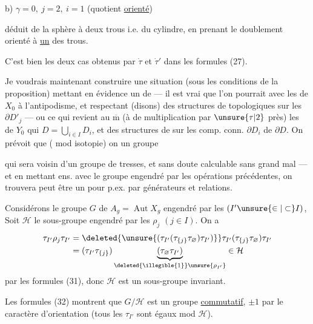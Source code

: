 b) $\gamma=0,\ j=2,\ i=1$ (quotient \uline{orienté})

déduit de la sphère à deux trous i.e. du cylindre, en prenant le doublement orienté  à \uline{un} des trous. 

C'est bien les deux cas obtenus  par $\dot\tau$ et $\dot\tau'$ dans les formules (27).

Je voudrais maintenant construire une situation (sous les conditions de la proposition) mettant en évidence un  de  --- il est vrai que l'on pourrait  avec  les  de $X_0$  à l'antipodisme\inserted{$\tau$},  et respectant (disons) des structures de  topologiques sur les $\partial D'_j$ --- ou ce qui revient  au $\overline{\mathrm m}$ (à  de multiplication par $\unsure{\tau|2}$ près) les  de $Y_0$ qui   $D=\bigcup_{i\in I}D_i$, et  des structures de  sur  les comp. conn. $\partial D_i$ de $\partial D$. On prévoit que ( mod isotopie) on  un groupe



qui sera voisin d'un groupe de tresses, et sans doute calculable sans grand mal --- et en  mettant ens. avec le groupe engendré par les opérations précédentes, on trouvera peut être un  pour  p.ex.  par générateurs  et relations.

Considérons le  groupe $G$ de $A_g=\operatorname{Aut}X_g$ engendré par les  $(I'\unsure{\in|\subset} I)$,  Soit $\mathcal H$  le sous-groupe engendré par les $\rho_j$ $(j\in I)$. On a
\[
\begin{aligned}
\tau_{I'}\rho_j\tau_{I'}
&=\deleted{\unsure{(\tau_{I'}(\tau_{\{j\}}\tau_{\varnothing})\tau_{I'})}}
\tau_{I'}(\tau_{\{j\}}\tau_{\varnothing})\tau_{I'}\\
&=(\tau_{I'}\tau_{\{j\}})
\underbrace{(\tau_{\varnothing}\tau_{I'})}_{\deleted{\illegible{1}}\unsure{\rho_{I'}}}
\in\mathcal H
\end{aligned}
\]
par les formules (31), donc $\mathcal H$ est un sous-groupe invariant.

Les formules (32) montrent que $G/\mathcal H$ est un groupe \uline{commutatif},  $\pm1$ par le caractère d'orientation (tous les $\tau_{I'}$ sont égaux mod $\mathcal H$).
